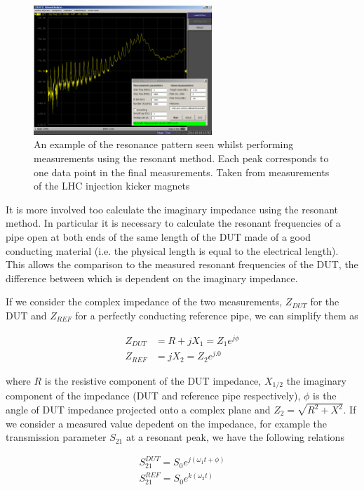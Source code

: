 \documentclass[review, number, sort&compress]{elsarticle}
\begin{document}
\begin{figure}
\begin{center}
\includegraphics[width=0.6\textwidth]{figures/coax-resonator.png}
\end{center}
\caption{An example of the resonance pattern seen whilst performing measurements using the resonant method. Each peak corresponds to one data point in the final measurements. Taken from measurements of the LHC injection kicker magnets}
\label{fig:res-resonancce-examples}
\end{figure}

It is more involved too calculate the imaginary impedance using the resonant method. In particular it is necessary to calculate the resonant frequencies of a pipe open at both ends of the same length of the DUT made of a good conducting material (i.e. the physical length is equal to the electrical length). This allows the comparison to the measured resonant frequencies of the DUT, the difference between which is dependent on the imaginary impedance.

If we consider the complex impedance of the two measurements, $Z_{DUT}$ for the DUT and $Z_{REF}$ for a perfectly conducting reference pipe, we can simplify them as

\begin{align}
Z_{DUT} & =  R + jX_{1}  =  Z_{1}e^{j \phi} \\
Z_{REF} & =  jX_{2}  =  Z_{2}e^{j.0}
\end{align}

where $R$ is the resistive component of the DUT impedance, $X_{1/2}$ the imaginary component of the impedance (DUT and reference pipe respectively), $\phi$ is the angle of DUT impedance projected onto a complex plane and $Z_{2} = \sqrt{R^{2} + X^{2}}$. If we consider a measured value depedent on the impedance, for example the transmission parameter $S_{21}$ at a resonant peak, we have the following relations

\begin{align}
S_{21}^{DUT} = S_{0}e^{j \left( \omega_{1}t + \phi \right)} \\
S_{21}^{REF} = S_{0}e^{k \left( \omega_{2}t \right)}
\end{align}
\end{document}

